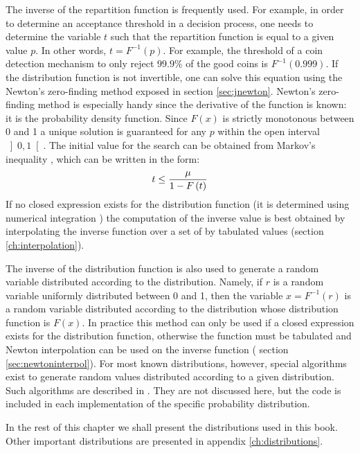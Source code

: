 \documentclass[twoside]{book}
\begin{document}
The inverse of the repartition function is frequently used. For
example, in order to determine an acceptance threshold in a
decision process, one needs to determine the variable $t$ such
that the repartition function is equal to a given value $p$. In
other words, $t=F^{-1}\left(p\right)$. For example, the threshold
of a coin detection mechanism to only reject $99.9\%$ of the good
coins is $F^{-1}\left(0.999\right)$. If the distribution function
is not invertible, one can solve this equation using the Newton's
zero-finding method exposed in section \ref{sec:jnewton}. Newton's
zero-finding method is especially handy since the derivative of
the function is known: it is the probability density function.
Since $F\left(x\right)$ is strictly monotonous between 0 and 1 a
unique solution is guaranteed for any $p$ within the open interval
$\left]0,1\right[$. The initial value for the search can be
obtained from Markov's inequality \cite{CorLeiRiv}, which can be
written in the form:
\begin{equation}
  t\le {\displaystyle \mu \over\displaystyle 1-F\left(t\right)}
\end{equation}
If no closed expression exists for the distribution function (it
is determined using numerical integration \eg) the computation of
the inverse value is best obtained by interpolating the inverse
function over a set of by tabulated values (\cf section
\ref{ch:interpolation}).

The inverse of the distribution function is also used to generate
a random variable distributed according to the distribution.
Namely, if $r$ is a random variable uniformly distributed between
0 and 1, then the variable $x=F^{-1}\left(r\right)$ is a random
variable distributed according to the distribution whose
distribution function is $F\left(x\right)$. In practice this
method can only be used if a closed expression exists for the
distribution function, otherwise the function must be tabulated
and Newton interpolation can be used on the inverse function (\cf
section \ref{sec:newtoninterpol}). For most known distributions,
however, special algorithms exist to generate random values
distributed according to a given distribution. Such algorithms are
described in \cite{LawKel}. They are not discussed here, but the
code is included in each implementation of the specific
probability distribution.

In the rest of this chapter we shall present the distributions
used in this book. Other important distributions are presented in
appendix \ref{ch:distributions}.
\end{document}
